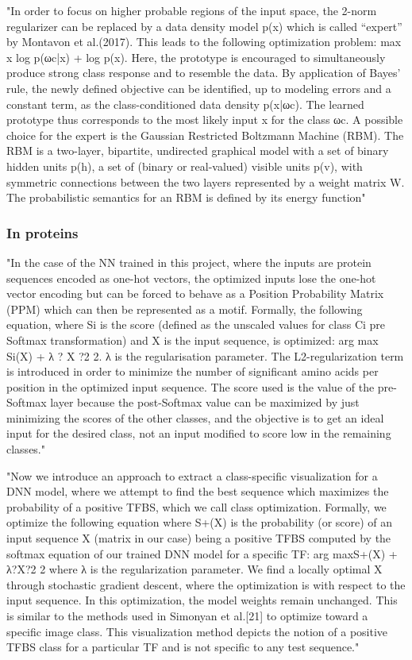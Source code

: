 \documentclass[]{scrartcl}
\begin{document}
	"In order to focus on higher probable regions of the input space, the
	2-norm regularizer can be replaced by a data density model p(x) which is called “expert” by Montavon et al.(2017). This leads to the following optimization problem:
	max x log p(ωc|x) + log p(x).
	Here, the prototype is encouraged to simultaneously produce strong class response and to  resemble  the  data.   By  application  of  Bayes’  rule,  the  newly  defined  objective  can  be identified, up to modeling errors and a constant term, as the class-conditioned data density p(x|ωc).  The learned prototype thus corresponds to the most likely input x for the class ωc.  A possible choice for the expert is the Gaussian Restricted Boltzmann Machine (RBM).
	The RBM is a two-layer, bipartite, undirected graphical model with a set of binary hidden units p(h), a set of (binary or real-valued) visible units p(v), with symmetric connections between the two layers represented by a weight matrix W.  The probabilistic semantics for an RBM is defined by its energy function" \cite{Montavon2018}
	
	\subsubsection{In proteins}
	"In the case of the NN trained in this project, where the inputs are protein sequences encoded as one-hot vectors, the optimized inputs lose the one-hot vector encoding but can be forced to behave as a Position Probability Matrix (PPM) which can then be represented as a motif. Formally, the following equation, where Si is the score (defined as the unscaled values for class Ci pre Softmax transformation) and X is the input sequence, is optimized:
	arg max Si(X) + λ ? X ?2 2.
	λ is the regularisation parameter. The L2-regularization term is introduced in order to minimize the number of significant amino acids per position in the optimized input sequence. The score used is the value of the pre-Softmax layer because the post-Softmax value can be maximized by just minimizing the scores of the other classes, and the objective is to get an ideal input for the desired class, not an input modified to score low in the remaining classes." \cite{Fontal2017}
	
	"Now we introduce an approach to extract a class-specific visualization for a DNN model, where we attempt to find the best sequence which maximizes the probability of a positive TFBS, which we call class optimization. Formally, we optimize the following equation where S+(X) is the probability (or score) of an input sequence X (matrix in our case) being a positive TFBS computed by the softmax equation of our trained DNN model for a specific TF:
	arg maxS+(X) + λ?X?2 2
	where λ is the regularization parameter. We find a locally optimal X through stochastic gradient descent, where the optimization is with respect to the input sequence. In this optimization, the model weights remain unchanged. This is similar to the methods used in Simonyan et al.[21] to optimize toward a specific image class. This visualization method depicts the notion of a positive TFBS class for a particular TF and is not specific to any test sequence." \cite{Lanchantin2016}
	
\end{document}
